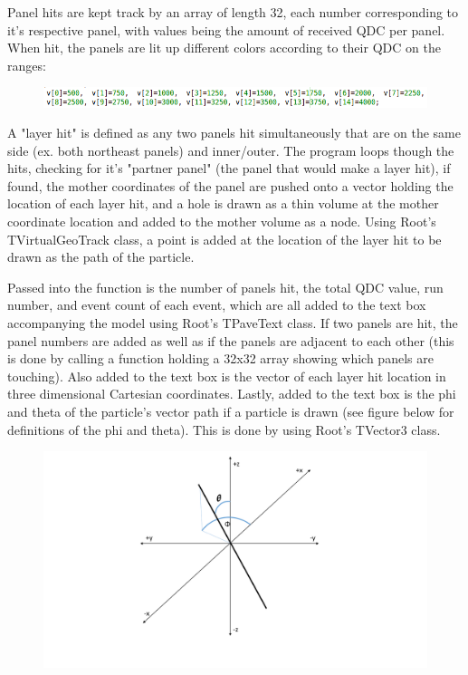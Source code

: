 \documentclass[a4paper,12pt]{article}
\begin{document}
Panel hits are kept track by an array of length 32, each number corresponding to it's respective panel, with values being the amount of received QDC per panel. When hit, the panels are lit up different colors according to their QDC on the ranges:

\begin{figure}[h]
\centering
\includegraphics[scale=0.5]{ranges.png}
\end{figure}

A "layer hit" is defined as any two panels hit simultaneously that are on the same side (ex. both northeast panels) and inner/outer. The program loops though the hits, checking for it's "partner panel" (the panel that would make a layer hit), if found, the mother coordinates of the panel are pushed onto a vector holding the location of each layer hit, and a hole is drawn as a thin volume at the mother coordinate location and added to the mother volume as a node. Using Root's TVirtualGeoTrack class, a point is added at the location of the layer hit to be drawn as the path of the particle.

Passed into the function is the number of panels hit, the total QDC value, run number, and event count of each event, which are all added to the text box accompanying the model using Root's TPaveText class. If two panels are hit, the panel numbers are added as well as if the panels are adjacent to each other (this is done by calling a function holding a 32x32 array showing which panels are touching). Also added to the text box is the vector of each layer hit location in three dimensional Cartesian coordinates. Lastly, added to the text box is the phi and theta of the particle's vector path if a particle is drawn (see figure below for definitions of the phi and theta). This is done by using Root's TVector3 class.

\begin{figure}[h]
\centering
\includegraphics[scale=0.3]{freeformthetaphi.pdf}
\end{figure}
\end{document}
